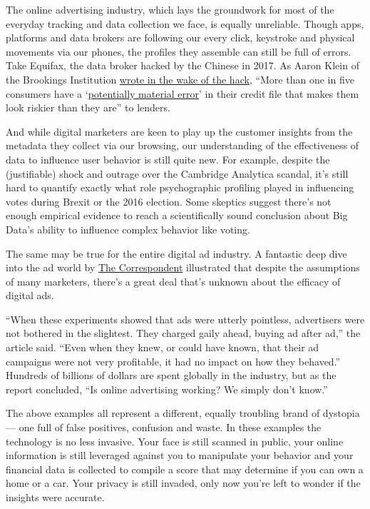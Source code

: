 The online advertising industry, which lays the groundwork for most of
the everyday tracking and data collection we face, is equally
unreliable. Though apps, platforms and data brokers are following our
every click, keystroke and physical movements via our phones, the
profiles they assemble can still be full of errors. Take Equifax, the
data broker hacked by the Chinese in 2017. As Aaron Klein of the
Brookings Institution
\href{https://www.cnbc.com/2017/09/27/the-real-problem-with-credit-reports-is-the-astounding-number-of-errors-equifax-commentary.html}{wrote
in the wake of the hack}, ``More than one in five consumers have a
`\href{https://www.ftc.gov/sites/default/files/documents/reports/section-319-fair-and-accurate-credit-transactions-act-2003-fifth-interim-federal-trade-commission/130211factareport.pdf}{potentially
material error}' in their credit file that makes them look riskier than
they are'' to lenders.

And while digital marketers are keen to play up the customer insights
from the metadata they collect via our browsing, our understanding of
the effectiveness of data to influence user behavior is still quite new.
For example, despite the (justifiable) shock and outrage over the
Cambridge Analytica scandal, it's still hard to quantify exactly what
role psychographic profiling played in influencing votes during Brexit
or the 2016 election. Some skeptics suggest there's not enough empirical
evidence to reach a scientifically sound conclusion about Big Data's
ability to influence complex behavior like voting.

The same may be true for the entire digital ad industry. A fantastic
deep dive into the ad world by
\href{https://thecorrespondent.com/100/the-new-dot-com-bubble-is-here-its-called-online-advertising/13228924500-22d5fd24}{The
Correspondent} illustrated that despite the assumptions of many
marketers, there's a great deal that's unknown about the efficacy of
digital ads.

``When these experiments showed that ads were utterly pointless,
advertisers were not bothered in the slightest. They charged gaily
ahead, buying ad after ad,'' the article said. ``Even when they knew, or
could have known, that their ad campaigns were not very profitable, it
had no impact on how they behaved.'' Hundreds of billions of dollars are
spent globally in the industry, but as the report concluded, ``Is online
advertising working? We simply don't know.''

The above examples all represent a different, equally troubling brand of
dystopia --- one full of false positives, confusion and waste. In these
examples the technology is no less invasive. Your face is still scanned
in public, your online information is still leveraged against you to
manipulate your behavior and your financial data is collected to compile
a score that may determine if you can own a home or a car. Your privacy
is still invaded, only now you're left to wonder if the insights were
accurate.

